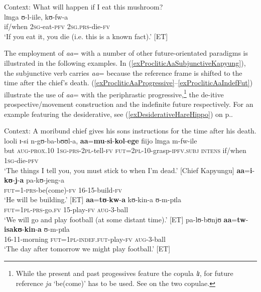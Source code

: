 \begin{exe}
\ex
\label{exPRSFuturateVsProclitic}
Context: What will happen if I eat this mushroom?\\
\gll lɪnga ʊ-l-iile, kʊ-fw-a\\
if/when \textsc{2sg}-eat-\textsc{pfv} \textsc{2sg.prs}-die-\textsc{fv}\\
\glt \lq If you eat it, you die (i.e. this is a known fact).' [ET]
\end{exe}

The employment of \textit{aa}= with a number of other future-orientated paradigms is illustrated in the following examples. In (\ref{exProcliticAaSubjunctiveKapyung}), the subjunctive verb carries \textit{aa}= because the reference frame is shifted to the time after the chief's death. (\ref{exProcliticAaProgressive}--\ref{exProcliticAaIndefFut}) illustrate the use of \textit{aa}= with the periphrastic progressive,\footnote{While the present and past progessives feature the copula \textit{lɪ}, for future reference \textit{ja} \lq be(come)' has to be used. See  on the two copulae.} the de-itive prospective/movement construction and the indefinite future respectively. For an example featuring the desiderative, see (\ref{exDesiderativeHareHippo}) on p.\nobreakspace\pageref{exDesiderativeHareHippo}.
\begin{exe}
\ex \label{exProcliticAaSubjunctiveKapyung}
Context: A moribund chief gives his sons instructions for the time after his death.\\
 \gll looli ɪ-si n-gʊ-ba-bʊʊl-a, \textbf{aa}=\textbf{mu}-\textbf{si}-\textbf{kol}-\textbf{ege} fiijo lɪnga m-fw-ile\\
but \textsc{aug}-\textsc{prox.10} \textsc{1sg}-\textsc{prs}-\textsc{2pl}-tell-\textsc{fv} \textsc{fut}=\textsc{2pl}-10-grasp-\textsc{ipfv.subj} \textsc{intens} if/when \textsc{1sg}-die-\textsc{pfv}\\
\glt `The things I tell you, you must stick to when I'm dead.' [Chief Kapyungu]
\ex \label{exProcliticAaProgressive} \gll \textbf{aa}=\textbf{i}-\textbf{kʊ}-\textbf{j}-\textbf{a} pa-kʊ-jeng-a\\
\textsc{fut}=1-\textsc{prs}-be(come)-\textsc{fv} 16-15-build-\textsc{fv}\\
\glt \lq He will be building.' [ET]
\ex \gll \textbf{aa}=\textbf{tʊ}-\textbf{kw}-\textbf{a} kʊ-kin-a ʊ-m-pɪla\\
\textsc{fut}=\textsc{1pl}-\textsc{prs}-go.\textsc{fv} 15-play-\textsc{fv} \textsc{aug}-3-ball\\
\glt \lq We will go and play football (at some distant time).' [ET]
\ex  \label{exProcliticAaIndefFut} \gll pa-lʊ-bʊnjʊ \textbf{aa}=\textbf{tw}-\textbf{isakʊ}-\textbf{kin}-\textbf{a} ʊ-m-pɪla\\
16-11-morning \textsc{fut}=\textsc{1pl}-\textsc{indef.fut}-play-\textsc{fv} \textsc{aug}-3-ball\\
\glt \lq The day after tomorrow we might play football.' [ET]
\end{exe}

